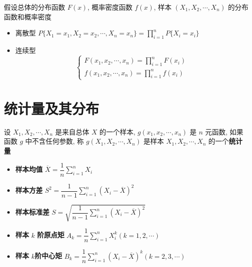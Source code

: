 \begin{definition}[样本分布]
	假设总体的分布函数 $F(x)$, 概率密度函数 $f(x)$, 样本 $(X_{1},X_{2},\cdots,X_{n})$ 的分布函数和概率密度
	\begin{itemize}
		\item 离散型 $P\{X_{1} = x_{1}, X_{2} = x_{2}, \cdots, X_{n} = x_{n}\} = \prod\limits_{i = 1}^{n}P\{X_{i} = x_{i}\}$
		\item 连续型 
		$$\begin{cases}
			F(x_{1},x_{2},\cdots,x_{n}) = \prod\limits_{i = 1}^{n}F(x_{i})\\
			f(x_{1},x_{2},\cdots,x_{n}) = \prod\limits_{i = 1}^{n}f(x_{i})
		\end{cases}$$
	\end{itemize}
\end{definition}

\section{统计量及其分布}
\begin{definition}
	设 $X_{1},X_{2},\cdots,X_{n}$ 是来自总体 $X$ 的一个样本,
	$g(x_{1}, x_{2}, \cdots, x_{n})$ 是 $n$ 元函数, 如果函数 $g$ 中不含任何参数, 称 $g(X_{1},X_{2},\cdots,X_{n})$ 是样本 $X_{1},X_{2},\cdots,X_{n}$ 的一个\textbf{统计量}
\end{definition}

\begin{definition}[样本数字特征]
	\begin{itemize}
		\item \textbf{样本均值} $\overline{X} = \dfrac{1}{n}\sum\limits_{i = 1}^{n}X_{i}$
		\item \textbf{样本方差} $S^{2} =\dfrac{1}{n-1}\sum\limits_{i = 1}^{n}(X_{i}-\overline{X})^2$
		\item \textbf{样本标准差} $S = \sqrt{\dfrac{1}{n-1}\sum\limits_{i = 1}^{n}(X_{i} - \overline{X})^{2}}$
		\item \textbf{样本} $k$ \textbf{阶原点矩}  $A_{k} = \dfrac{1}{n}\sum\limits_{i = 1}^{n}X_{i}^{k} (k = 1,2,\cdots)$
		\item \textbf{样本} $k$\textbf{阶中心矩} $B_{k} = \dfrac{1}{n}\sum\limits_{i = 1}^{n}(X_{i}-\overline{X})^{k} (k = 2, 3, \cdots)$
	\end{itemize}
\end{definition}

